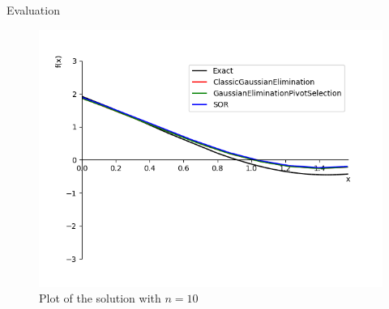 \documentclass{beamer}
\begin{document}
	\begin{frame}{Evaluation}
		\begin{figure}
			\includegraphics[width=.8\textwidth]{evaluation_tex.png}
			\caption{Plot of the solution with $n=10$}
		\end{figure}
	\end{frame}
\end{document}
